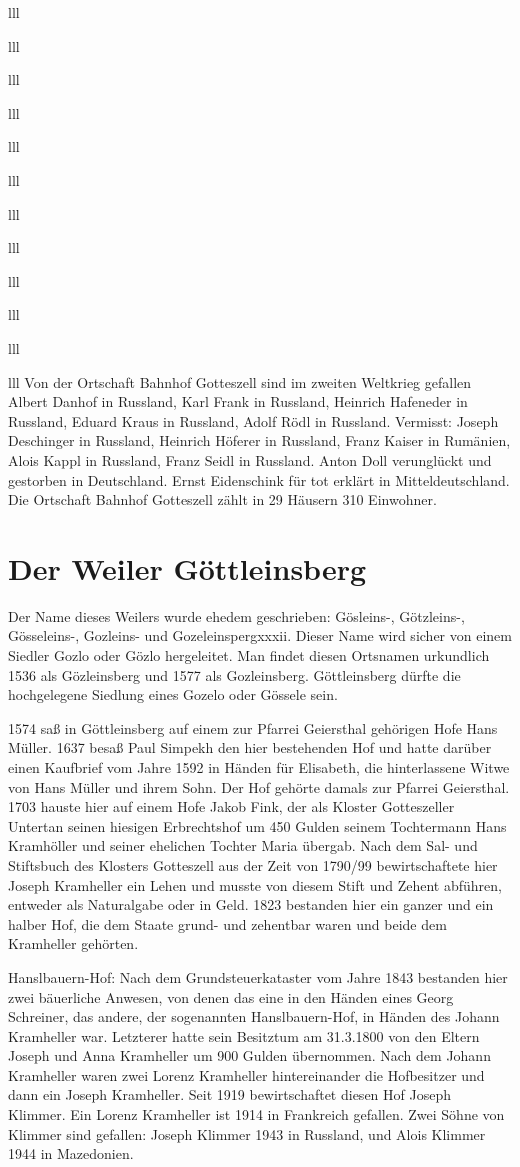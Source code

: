 \documentclass[12pt,a4pager]{book}
\begin{document}
\begin{tabuluar}{lll}
\begin{tabuluar}{lll}
\begin{tabuluar}{lll}
\begin{tabuluar}{lll}
\begin{tabuluar}{lll}
\begin{tabuluar}{lll}
\begin{tabuluar}{lll}
\begin{tabuluar}{lll}
\begin{tabuluar}{lll}
\begin{tabuluar}{lll}
\begin{tabuluar}{lll}
\begin{tabuluar}{lll}
Von der Ortschaft Bahnhof Gotteszell sind im zweiten Weltkrieg gefallen Albert
Danhof in Russland, Karl Frank in Russland, Heinrich Hafeneder in Russland,
Eduard Kraus in Russland, Adolf Rödl in Russland. Vermisst: Joseph Deschinger in
Russland, Heinrich Höferer in Russland, Franz Kaiser in Rumänien, Alois Kappl in
Russland, Franz Seidl in Russland. Anton Doll verunglückt und gestorben in
Deutschland. Ernst Eidenschink für tot erklärt in Mitteldeutschland. Die
Ortschaft Bahnhof Gotteszell zählt in 29 Häusern 310 Einwohner.

\section{Der Weiler Göttleinsberg}

Der Name dieses Weilers wurde ehedem geschrieben: Gösleins-, Götzleins-,
Gösseleins-, Gozleins- und Gozeleinspergxxxii. Dieser Name wird sicher von einem
Siedler Gozlo oder Gözlo hergeleitet. Man findet diesen Ortsnamen urkundlich
1536 als Gözleinsberg und 1577 als Gozleinsberg. Göttleinsberg dürfte die
hochgelegene Siedlung eines Gozelo oder Gössele sein.

1574 saß in Göttleinsberg auf einem zur Pfarrei Geiersthal gehörigen Hofe Hans
Müller. 1637 besaß Paul Simpekh den hier bestehenden Hof und hatte darüber einen
Kaufbrief vom Jahre 1592 in Händen für Elisabeth, die hinterlassene Witwe von
Hans Müller und ihrem Sohn. Der Hof gehörte damals zur Pfarrei Geiersthal. 1703
hauste hier auf einem Hofe Jakob Fink, der als Kloster Gotteszeller Untertan
seinen hiesigen Erbrechtshof um 450 Gulden seinem Tochtermann Hans Kramhöller
und seiner ehelichen Tochter Maria übergab. Nach dem Sal- und Stiftsbuch des
Klosters Gotteszell aus der Zeit von 1790/99 bewirtschaftete hier Joseph
Kramheller ein Lehen und musste von diesem Stift und Zehent abführen, entweder
als Naturalgabe oder in Geld. 1823 bestanden hier ein ganzer und ein halber Hof,
die dem Staate grund- und zehentbar waren und beide dem Kramheller gehörten.

Hanslbauern-Hof: Nach dem Grundsteuerkataster vom Jahre 1843 bestanden hier zwei
bäuerliche Anwesen, von denen das eine in den Händen eines Georg Schreiner, das
andere, der sogenannten Hanslbauern-Hof, in Händen des Johann Kramheller war.
Letzterer hatte sein Besitztum am 31.3.1800 von den Eltern Joseph und Anna
Kramheller um 900 Gulden übernommen. Nach dem Johann Kramheller waren zwei
Lorenz Kramheller hintereinander die Hofbesitzer und dann ein Joseph Kramheller.
Seit 1919 bewirtschaftet diesen Hof Joseph Klimmer. Ein Lorenz Kramheller ist
1914 in Frankreich gefallen. Zwei Söhne von Klimmer sind gefallen: Joseph
Klimmer 1943 in Russland, und Alois Klimmer 1944 in Mazedonien.


\end{tabuluar}
\end{tabuluar}
\end{tabuluar}
\end{tabuluar}
\end{tabuluar}
\end{tabuluar}
\end{tabuluar}
\end{tabuluar}
\end{tabuluar}
\end{tabuluar}
\end{tabuluar}
\end{tabuluar}
\end{document}
